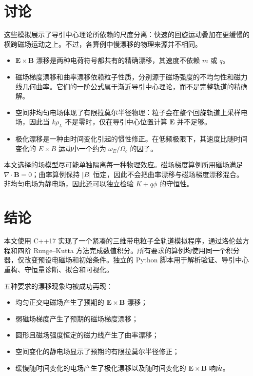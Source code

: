 \documentclass[UTF8,11pt,a4paper]{ctexart}
\newcommand{\vect}[1]{\boldsymbol{#1}}
\newcommand{\Ohm}{\Omega_c}
\newcommand{\rhL}{\rho_L}
\begin{document}
\section{讨论}

这些模拟展示了导引中心理论所依赖的尺度分离：快速的回旋运动叠加在更缓慢的横跨磁场运动之上。不过，各算例中慢漂移的物理来源并不相同。

\begin{itemize}
    \item $\vect{E}\times\vect{B}$ 漂移是两种电荷符号都共有的精确漂移，其速度不依赖 $m$ 或 $q$。
    \item 磁场梯度漂移和曲率漂移依赖粒子性质，分别源于磁场强度的不均匀性和磁力线几何曲率。它们的一阶公式属于渐近导引中心理论，而不是完整轨道的精确解。
    \item 空间非均匀电场体现了有限拉莫尔半径物理：粒子会在整个回旋轨道上采样电场，因此当 $k\rhL$ 不是零时，仅在导引中心位置计算 $\vect{E}$ 并不足够。
    \item 极化漂移是一种由时间变化引起的惯性修正。在低频极限下，其速度比随时间变化的 $E\times B$ 运动小一个约为 $\omega_E/\Ohm$ 的因子。
\end{itemize}

本文选择的场模型尽可能单独隔离每一种物理效应。磁场梯度算例所用磁场满足 $\nabla\cdot\vect{B}=0$；曲率算例保持 $|B|$ 恒定，因此不会把曲率漂移与磁场梯度漂移混合。非均匀电场为静电场，因此还可以独立检验 $K+q\phi$ 的守恒性。

\section{结论}

本文使用 C++17 实现了一个紧凑的三维带电粒子全轨道模拟程序，通过洛伦兹方程和四阶 Runge--Kutta 方法完成数值积分。所有要求的算例均使用同一个积分器，仅改变预设电磁场和初始条件。独立的 Python 脚本用于解析验证、导引中心重构、守恒量诊断、拟合和可视化。

五种要求的漂移现象均被成功再现：
\begin{itemize}
    \item 均匀正交电磁场产生了预期的 $\vect{E}\times\vect{B}$ 漂移；
    \item 弱磁场梯度产生了预期的磁场梯度漂移；
    \item 圆形且磁场强度恒定的磁力线产生了曲率漂移；
    \item 空间变化的静电场显示了预期的有限拉莫尔半径修正；
    \item 缓慢随时间变化的电场产生了极化漂移以及随时间变化的 $\vect{E}\times\vect{B}$ 响应。
\end{itemize}
\end{document}
